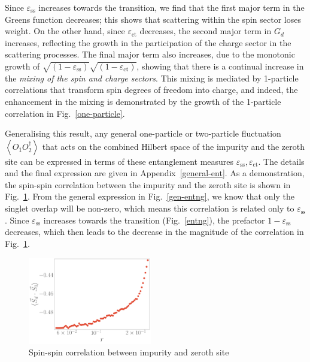 \documentclass[reprint,superscriptaddress,floatfix]{revtex4-2}
\begin{document}
Since \(\varepsilon_\text{ss}\) increases towards the transition, we find that the first major term in the Greens function decreases; this shows that scattering within the spin sector loses weight.
On the other hand, since \(\varepsilon_\text{ct}\) decreases, the second major term in \(G_d\) increases, reflecting the growth in the participation of the charge sector in the scattering processes.
The final major term also increases, due to the monotonic growth of \(\sqrt{\left(1 - \varepsilon_\text{ss} \right)}\sqrt{\left(1 - \varepsilon_\text{ct} \right)}\), showing that there is a continual increase in the {\it mixing of the spin and charge sectors}. This mixing is mediated by 1-particle correlations that transform spin degrees of freedom into charge, and indeed, the enhancement in the mixing is demonstrated by the growth of the 1-particle correlation in Fig.~\ref{one-particle}.

{\color{blue}Generalising this result, any general one-particle or two-particle fluctuation \(\left<O_1 O_2^\dagger \right>\) that acts on the combined Hilbert space of the impurity and the zeroth site can be expressed in terms of these entanglement measures \(\varepsilon_\text{ss},\varepsilon_\text{ct}\). The details and the final expression are given in Appendix~\ref{general-ent}. As a demonstration, the spin-spin correlation between the impurity and the zeroth site is shown in Fig.~\ref{compens}. From the general expression in Fig.~\ref{gen-entng}, we know that only the singlet overlap will be non-zero, which means this correlation is related only to \(\varepsilon_\text{ss}\). Since \(\varepsilon_\text{ss}\) increases towards the transition (Fig.~\ref{entng}), the prefactor \(1 - \varepsilon_\text{ss}\) decreases, which then leads to the decrease in the magnitude of the correlation in Fig.~\ref{compens}.}

\begin{figure}[!htb]
	\centering
	\includegraphics[width=0.48\textwidth]{compens.pdf}
	\caption{Spin-spin correlation between impurity and zeroth site}
	\label{compens}
\end{figure}
\end{document}
